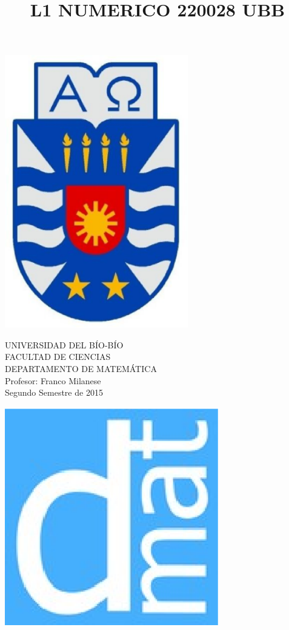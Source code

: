 \documentclass[11pt]{article}
\begin{document}
\title{L1 NUMERICO 220028 UBB}

{\begin{minipage}{2cm}
\hspace*{1cm}\includegraphics[width=0.6\textwidth]{escubo-ubb.eps}
\end{minipage}
\begin{minipage}{12cm}
\small
{\bf \rm 
{
\begin{center}
{\footnotesize UNIVERSIDAD DEL B\'IO-B\'IO} \\
{\scriptsize FACULTAD DE CIENCIAS}  \\
{\scriptsize DEPARTAMENTO DE MATEM\'ATICA}  \\
{\scriptsize Profesor:  Franco Milanese}\\
{\scriptsize Segundo Semestre de 2015}
\end{center}
}}
\end{minipage}}
{\begin{minipage}{2cm}
\hspace*{-0.5cm}\vspace*{-0.05cm}\includegraphics[width=0.7\textwidth]{escudo-dmat.eps}
\end{minipage}}
\end{document}
